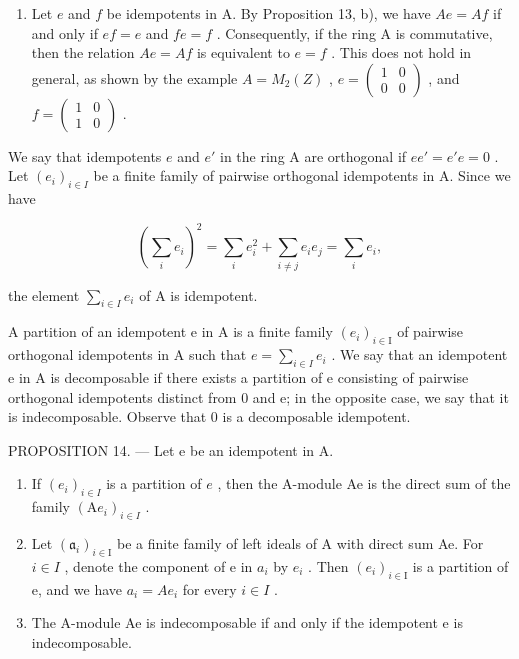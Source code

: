 \begin{enumerate}
\def\labelenumi{\arabic{enumi})}
\setcounter{enumi}{1}
\tightlist
\item
  Let \(e\) and \(f\) be idempotents in A. By Proposition 13, b), we have \(Ae = Af\) if and only if \(ef = e\) and \(fe = f\) . Consequently, if the ring A is commutative, then the relation \(Ae = Af\) is equivalent to \(e = f\) . This does not hold in general, as shown by the example \(A = M_2(Z)\) , \(e = \begin{pmatrix} 1 & 0 \\ 0 & 0 \end{pmatrix}\) , and \(f = \begin{pmatrix} 1 & 0 \\ 1 & 0 \end{pmatrix}\) .
\end{enumerate}

We say that idempotents \(e\) and \(e'\) in the ring A are orthogonal if \(ee' = e'e = 0\) . Let \((e_i)_{i \in I}\) be a finite family of pairwise orthogonal idempotents in A. Since we have

\[
\left(\sum_ {i} e _ {i}\right) ^ {2} = \sum_ {i} e _ {i} ^ {2} + \sum_ {i \neq j} e _ {i} e _ {j} = \sum_ {i} e _ {i},
\]

the element \(\sum_{i\in I}e_i\) of A is idempotent.

A partition of an idempotent e in A is a finite family \((e_{i})_{i\in\mathrm{I}}\) of pairwise orthogonal idempotents in A such that \(e=\sum_{i\in I}e_{i}\) . We say that an idempotent e in A is decomposable if there exists a partition of e consisting of pairwise orthogonal idempotents distinct from 0 and e; in the opposite case, we say that it is indecomposable. Observe that 0 is a decomposable idempotent.

PROPOSITION 14. --- Let e be an idempotent in A.

\begin{enumerate}
\def\labelenumi{\alph{enumi})}
\item
  If \((e_i)_{i\in I}\) is a partition of \(e\) , then the A-module Ae is the direct sum of the family \((\mathrm{A}e_i)_{i\in I}\) .
\item
  Let \((\mathfrak{a}_{i})_{i\in\mathrm{I}}\) be a finite family of left ideals of A with direct sum Ae. For \(i\in I\) , denote the component of e in \(a_{i}\) by \(e_{i}\) . Then \((e_{i})_{i\in\mathrm{I}}\) is a partition of e, and we have \(a_{i}=Ae_{i}\) for every \(i\in I\) .
\item
  The A-module Ae is indecomposable if and only if the idempotent e is indecomposable.
\end{enumerate}


